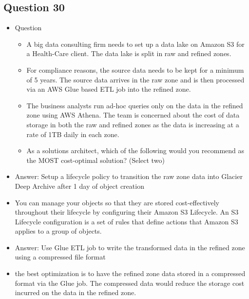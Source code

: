 \documentclass[]{scrartcl}
\begin{document}
\subsection{Question 30}
\begin{itemize}
	\item Question
	\begin{itemize}
		\item A big data consulting firm needs to set up a data lake on Amazon S3 for a Health-Care client. The data lake is split in raw and refined zones. 
		\item For compliance reasons, the source data needs to be kept for a minimum of 5 years. The source data arrives in the raw zone and is then processed via an AWS Glue based ETL job into the refined zone. 
		\item The business analysts run ad-hoc queries only on the data in the refined zone using AWS Athena. The team is concerned about the cost of data storage in both the raw and refined zones as the data is increasing at a rate of 1TB daily in each zone.
		\item As a solutions architect, which of the following would you recommend as the MOST cost-optimal solution? (Select two)
	\end{itemize}
	\item Answer: Setup a lifecycle policy to transition the raw zone data into Glacier Deep Archive after 1 day of object creation
	\item You can manage your objects so that they are stored cost-effectively throughout their lifecycle by configuring their Amazon S3 Lifecycle. An S3 Lifecycle configuration is a set of rules that define actions that Amazon S3 applies to a group of objects. 
	\item Answer: Use Glue ETL job to write the transformed data in the refined zone using a compressed file format
	\item the best optimization is to have the refined zone data stored in a compressed format via the Glue job. The compressed data would reduce the storage cost incurred on the data in the refined zone.
\end{itemize}
\end{document}
